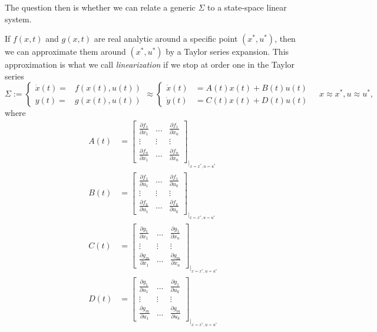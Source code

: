 The question then is whether we can relate a generic $\Sigma$ to a state-space linear system.

If $f(x,t)$ and $g(x,t)$ are real analytic around a specific point $(x^*,u^*)$, then we can approximate them around $(x^*,u^*)$ by a Taylor series expansion. This approximation is what we call \emph{linearization} if we stop at order one in the Taylor series
\begin{equation}
	\Sigma := \begin{cases}
		\dot x(t) =& f(x(t),u(t)) \\ y(t) =& g(x(t),u(t))
	\end{cases} \approx
	\begin{cases}
	\dot x(t) &= A(t)x(t) + B(t)u(t) \\
	\dot y(t) &= C(t)x(t) + D(t)u(t)
\end{cases}  \quad x\approx x^*, u\approx u^*, \nonumber
\end{equation}
where
\begin{align}
	A(t) &= \begin{bmatrix}
		\frac{\partial f_1}{\partial x_1} & \dots & \frac{\partial f_1}{\partial x_n} \\
		\vdots & \vdots & \vdots \\
		\frac{\partial f_n}{\partial x_1} & \dots & \frac{\partial f_n}{\partial x_n}
	\end{bmatrix}_{|_{x=x^*, u=u^*}} \nonumber \\
	B(t) &= \begin{bmatrix}
		\frac{\partial f_1}{\partial u_1} & \dots & \frac{\partial f_1}{\partial u_k} \\
		\vdots & \vdots & \vdots \\
		\frac{\partial f_k}{\partial u_1} & \dots & \frac{\partial f_k}{\partial u_k}
	\end{bmatrix}_{|_{x=x^*, u=u^*}} \nonumber \\
	C(t) &= \begin{bmatrix}
		\frac{\partial g_1}{\partial x_1} & \dots & \frac{\partial g_1}{\partial x_n} \\
		\vdots & \vdots & \vdots \\
		\frac{\partial g_m}{\partial x_1} & \dots & \frac{\partial g_m}{\partial x_n}
	\end{bmatrix}_{|_{x=x^*, u=u^*}} \nonumber \\
	D(t) &= \begin{bmatrix}
		\frac{\partial g_1}{\partial u_1} & \dots & \frac{\partial g_1}{\partial u_k} \\
		\vdots & \vdots & \vdots \\
		\frac{\partial g_m}{\partial u_1} & \dots & \frac{\partial g_m}{\partial u_k}
	\end{bmatrix}_{|_{x=x^*, u=u^*}} \nonumber
\end{align}
